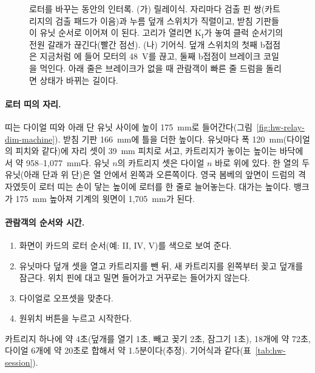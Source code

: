 \begin{figure}[ht]
\centering

\caption{로터를 바꾸는 동안의 인터록. (가) 릴레이식. 자리마다 검출 핀 쌍(카트리지의 검출 패드가 이음)과 누름 덮개
스위치가 직렬이고, 받침 기판들이 유닛 순서로 이어져 이 된다. 고리가 열리면 K$_\mathrm{I}$가 놓여 클럭
순서기의 전원 갈래가 끊긴다(빨간 점선). (나) 기어식. 덮개 스위치의 첫째 b접점은 지금처럼 에 들어 모터의
48~V를 끊고, 둘째 b접점이 브레이크 코일을 먹인다. 아래 줄은 브레이크가 없을 때 관람객이 빠른 줄 드럼을 돌리면 상태가
바뀌는 길이다.}
\label{fig:hw-rotor-interlock}
\end{figure}

\paragraph{로터 띠의 자리.} 띠는 다이얼 띠와 아래 단 유닛 사이에 높이 175~mm로 들어간다(그림~\ref{fig:hw-relay-dim-machine}).
받침 기판 166~mm에 틀을 더한 높이다. 유닛마다 폭 120~mm(다이얼의 피치와 같다)에 자리 셋이 39~mm 피치로 서고,
카트리지가 놓이는 높이는 바닥에서 약 958--1,077~mm다. 유닛 $n$의 카트리지 셋은 다이얼 $n$ 바로 위에 있다. 한 열의
두 유닛(아래 단과 위 단)은 열 안에서 왼쪽과 오른쪽이다. 영국 봄베의 앞면이 드럼의 격자였듯이 로터 띠는 손이 닿는
높이에 로터를 한 줄로 늘어놓는다. 대가는 높이다. 뱅크가 175~mm 높아져 기계의 윗면이 1,705~mm가 된다.

\paragraph{관람객의 순서와 시간.}
\begin{enumerate}
\item 화면이 카드의 로터 순서(예: II, IV, V)를 색으로 보여 준다.
\item 유닛마다 덮개 셋을 열고 카트리지를 뺀 뒤, 새 카트리지를 왼쪽부터 꽂고 덮개를 잠근다. 위치 핀에 대고 밀면
들어가고 거꾸로는 들어가지 않는다.
\item 다이얼로 오프셋을 맞춘다.
\item 원위치 버튼을 누르고 시작한다.
\end{enumerate}
카트리지 하나에 약 4초(덮개를 열기 1초, 빼고 꽂기 2초, 잠그기 1초), 18개에 약 72초, 다이얼 6개에 약 20초로 합해서
약 1.5분이다(추정). 기어식과 같다(표~\ref{tab:hw-session}).

